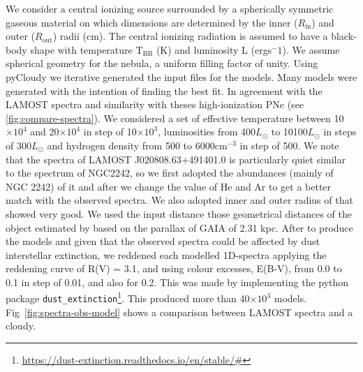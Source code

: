 \documentclass[fleqn,usenatbib]{mnras}
\begin{document}
We consider a central ionizing source surrounded by a spherically symmetric
gaseous material on which dimensions are determined by the inner ($R_{\mathrm{in}}$) and
outer ($R_{\mathrm{out}}$) radii (cm). The central ionizing radiation is assumed to have a
black-body shape with temperature T$_{\mathrm{BB}}$ (K) and luminosity L
(ergs$^-1$). We assume spherical geometry for the nebula, a uniform filling factor of unity.
Using {\sc pyCloudy} we iterative generated the input files for the models.
Many models were generated with the intention of finding the best fit.
In agreement with the LAMOST spectra and similarity with theses high-ionization PNe
(see \ref{fig:compare-spectra}).
We considered a set of effective temperature between 10$\times10^4$ and 20$\times10^4$
in step of 10$\times10^3$, luminosities from 400$L_{\odot}$ to 10100$L_{\odot}$ in steps
of 300$L_{\odot}$ and hydrogen density from 500 to  6000cm$^{-3}$ in step of 500.
We note that the spectra of LAMOST J020808.63+491401.0 is particularly quiet similar to the
spectrum of NGC2242, so we first adopted the abundances (mainly of NGC 2242) of it and after
we change the value of He and Ar to get a better match with the observed spectra.
We also adopted inner and outer radius of that showed very good. We used the input
distance those geometrical distances of the object estimated by \citet{Bailer:2021} based on
the parallax of GAIA of 2.31 kpc.
After to produce the models and given that the observed spectra could be affected by
dust interstellar extinction, we reddened each modelled 1D-spectra applying the
reddening curve of R(V) = 3.1, and using colour excesses, E(B-V), from 0.0 to 0.1 in
step of 0.01, and also for 0.2. This was made by implementing the python
package \texttt{dust\_extinction}\footnote{\url{https://dust-extinction.readthedocs.io/en/stable/#}}. This produced more than 40$\times10^3$ models. Fig~\ref{fig:spectra-obs-model} shows a
comparison between LAMOST spectra and a {\sc cloudy}. %
\end{document}

